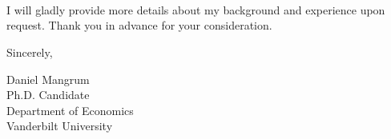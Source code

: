 \documentclass{letter}
\begin{document}
{{{\begin{letter}{\Name \\ \Address \\ \City \State~\Zip}
{\CoverBonusGeneral 
}{}

I will gladly provide more details about my background and experience upon request. Thank you in advance for your consideration.

\vspace{.5cm} 
Sincerely,

\vspace{.25cm} 
Daniel Mangrum \\
Ph.D. Candidate\\
Department of Economics \\
Vanderbilt University

\end{letter}}{}

}
}
\end{document}
